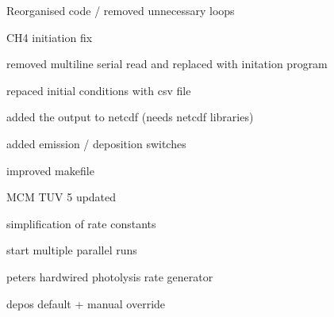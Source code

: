 
\begin{DoxyItemize}
\item Reorganised code / removed unnecessary loops
\item C\+H4 initiation fix
\item removed multiline serial read and replaced with initation program
\item repaced initial conditions with csv file
\item added the output to netcdf (needs netcdf libraries)
\item added emission / deposition switches
\item improved makefile
\item M\+CM T\+UV 5 updated
\item simplification of rate constants
\item start multiple parallel runs
\item peters hardwired photolysis rate generator
\item depos default + manual override 
\end{DoxyItemize}